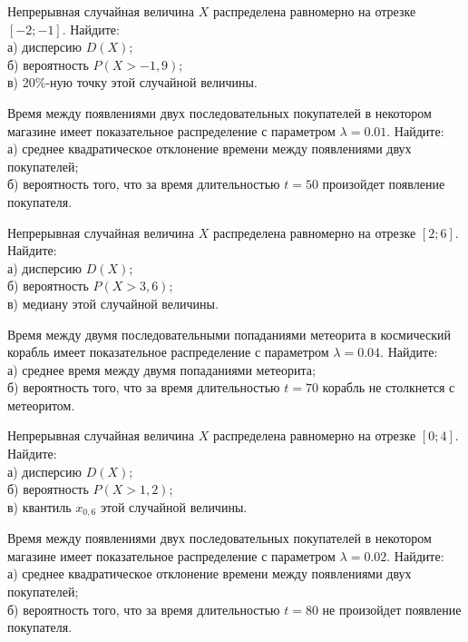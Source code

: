 \vfill

\newpage\setcounter{zad}{0}

\z Непрерывная случайная величина $X$ распределена равномерно на отрезке $[-2; -1]$. Найдите: \\ \quad а) дисперсию $D(X)$; \\ \quad б) вероятность $P(X>-1{,}9)$; \\ \quad в) $20\%$-ную точку этой случайной величины.


\vfill

\z Время между появлениями двух последовательных покупателей в некотором магазине имеет показательное распределение с параметром $\lambda = 0.01$. Найдите: \\ \quad а) среднее квадратическое отклонение времени между появлениями двух покупателей; \\ \quad б) вероятность того, что за время длительностью $t = 50$  произойдет появление покупателя.
 

\vfill

\newpage\setcounter{zad}{0}

\z Непрерывная случайная величина $X$ распределена равномерно на отрезке $[2; 6]$. Найдите: \\ \quad а) дисперсию $D(X)$; \\ \quad б) вероятность $P(X>3{,}6)$; \\ \quad в) медиану этой случайной величины.


\vfill

\z Время между двумя последовательными попаданиями метеорита в космический корабль имеет показательное распределение с параметром $\lambda = 0.04$. Найдите: \\ \quad а) среднее время между двумя попаданиями метеорита; \\ \quad б) вероятность того, что за время длительностью $t = 70$ корабль не столкнется с метеоритом.
 

\vfill

\newpage\setcounter{zad}{0}

\z Непрерывная случайная величина $X$ распределена равномерно на отрезке $[0; 4]$. Найдите: \\ \quad а) дисперсию $D(X)$; \\ \quad б) вероятность $P(X>1{,}2)$; \\ \quad в) квантиль $x_{0{,}6}$ этой случайной величины.


\vfill

\z Время между появлениями двух последовательных покупателей в некотором магазине имеет показательное распределение с параметром $\lambda = 0.02$. Найдите: \\ \quad а) среднее квадратическое отклонение времени между появлениями двух покупателей; \\ \quad б) вероятность того, что за время длительностью $t = 80$ не произойдет появление покупателя.
 

